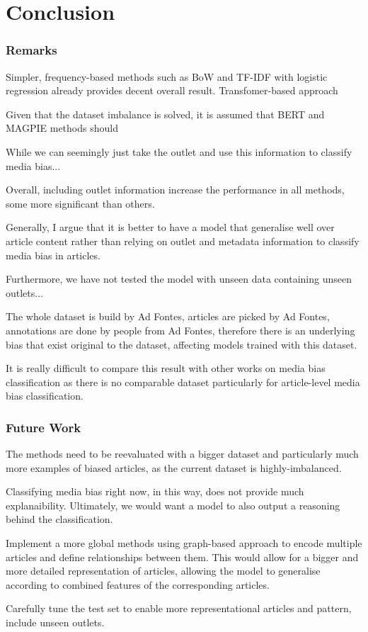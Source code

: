 \chapter{Conclusion}
\label{cha:7}

\subsection{Remarks}

Simpler, frequency-based methods such as BoW and TF-IDF with logistic regression already provides decent overall result. Transfomer-based approach

Given that the dataset imbalance is solved, it is assumed that BERT and MAGPIE methods should

While we can seemingly just take the outlet and use this information to classify media bias...

Overall, including outlet information increase the performance in all methods, some more significant than others.

Generally, I argue that it is better to have a model that generalise well over article content rather than relying on outlet and metadata information to classify media bias in articles.

Furthermore, we have not tested the model with unseen data containing unseen outlets...

The whole dataset is build by Ad Fontes, articles are picked by Ad Fontes, annotations are done by people from Ad Fontes, therefore there is an underlying bias that exist original to the dataset, affecting models trained with this dataset.

It is really difficult to compare this result with other works on media bias classification as there is no comparable dataset particularly for article-level media bias classification.

\subsection{Future Work}

The methods need to be reevaluated with a bigger dataset and particularly much more examples of biased articles, as the current dataset is highly-imbalanced.

Classifying media bias right now, in this way, does not provide much explanaibility. Ultimately, we would want a model to also output a reasoning behind the classification.

Implement a more global methods using graph-based approach to encode multiple articles and define relationships between them. This would allow for a bigger and more detailed representation of articles, allowing the model to generalise according to combined features of the corresponding articles.

Carefully tune the test set to enable more representational articles and pattern, include unseen outlets.

